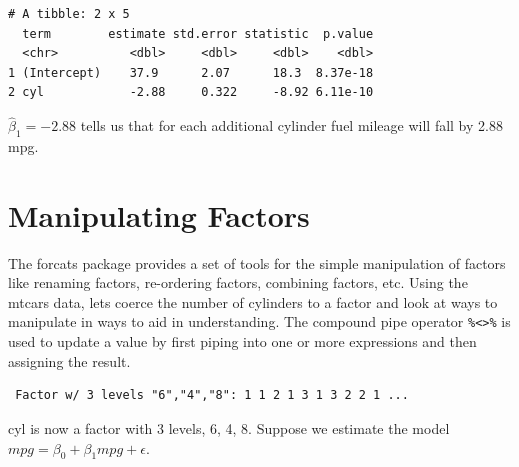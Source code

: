 \documentclass[]{book}
\newenvironment{Shaded}{\begin{snugshade}}{\end{snugshade}}
\newcommand{\CommentTok}[1]{\textcolor[rgb]{0.56,0.35,0.01}{\textit{#1}}}
\newcommand{\KeywordTok}[1]{\textcolor[rgb]{0.13,0.29,0.53}{\textbf{#1}}}
\newcommand{\NormalTok}[1]{#1}
\newcommand{\OperatorTok}[1]{\textcolor[rgb]{0.81,0.36,0.00}{\textbf{#1}}}
\newcommand{\StringTok}[1]{\textcolor[rgb]{0.31,0.60,0.02}{#1}}
\begin{document}
\begin{verbatim}
# A tibble: 2 x 5
  term        estimate std.error statistic  p.value
  <chr>          <dbl>     <dbl>     <dbl>    <dbl>
1 (Intercept)    37.9      2.07      18.3  8.37e-18
2 cyl            -2.88     0.322     -8.92 6.11e-10
\end{verbatim}

\(\hat\beta_1=-2.88\) tells us that for each additional cylinder fuel mileage will fall by 2.88 mpg.

\hypertarget{manipulating-factors}{%
\section{Manipulating Factors}\label{manipulating-factors}}

The forcats package provides a set of tools for the simple manipulation of factors like renaming factors, re-ordering factors, combining factors, etc. Using the mtcars data, lets coerce the number of cylinders to a factor and look at ways to manipulate in ways to aid in understanding. The compound pipe operator \texttt{\%\textless{}\textgreater{}\%} is used to update a value by first piping into one or more expressions and then assigning the result.

\begin{Shaded}
\end{Shaded}

\begin{verbatim}
 Factor w/ 3 levels "6","4","8": 1 1 2 1 3 1 3 2 2 1 ...
\end{verbatim}

cyl is now a factor with 3 levels, 6, 4, 8. Suppose we estimate the model \(mpg = \beta_0 + \beta_1mpg+\epsilon\).

\begin{Shaded}
\end{Shaded}
\end{document}
